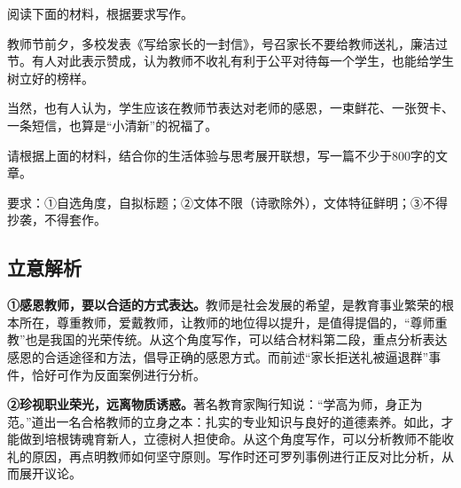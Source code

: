 阅读下面的材料，根据要求写作。

教师节前夕，多校发表《写给家长的一封信》，号召家长不要给教师送礼，廉洁过节。有人对此表示赞成，认为教师不收礼有利于公平对待每一个学生，也能给学生树立好的榜样。

当然，也有人认为，学生应该在教师节表达对老师的感恩，一束鲜花、一张贺卡、一条短信，也算是“小清新”的祝福了。

请根据上面的材料，结合你的生活体验与思考展开联想，写一篇不少于800字的文章。

要求：①自选角度，自拟标题；②文体不限（诗歌除外），文体特征鲜明；③不得抄袭，不得套作。

\subsection*{立意解析}

\textbf{①感恩教师，要以合适的方式表达。}教师是社会发展的希望，是教育事业繁荣的根本所在，尊重教师，爱戴教师，让教师的地位得以提升，是值得提倡的，“尊师重教”也是我国的光荣传统。从这个角度写作，可以结合材料第二段，重点分析表达感恩的合适途径和方法，倡导正确的感恩方式。而前述“家长拒送礼被逼退群”事件，恰好可作为反面案例进行分析。

\textbf{②珍视职业荣光，远离物质诱惑。}著名教育家陶行知说：“学高为师，身正为范。”道出一名合格教师的立身之本：扎实的专业知识与良好的道德素养。如此，才能做到培根铸魂育新人，立德树人担使命。从这个角度写作，可以分析教师不能收礼的原因，再点明教师如何坚守原则。写作时还可罗列事例进行正反对比分析，从而展开议论。
